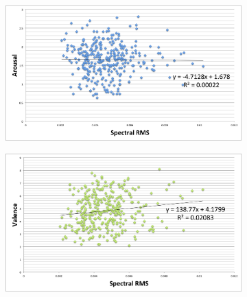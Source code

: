 \begin{figure}
             \centering
        \begin{subfigure}[b]{0.48\textwidth}
                \includegraphics[width=\textwidth]{Figures/spectralrms-arousal}
			   \vspace{20pt}
        \end{subfigure}
        \begin{subfigure}[b]{0.48\textwidth}
                \includegraphics[width=\textwidth]{Figures/spectralrms-valence}
                  \vspace{20pt}
        \end{subfigure}
        
\end{figure}

